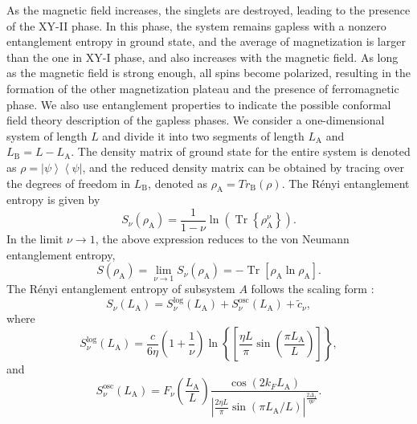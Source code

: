 \documentclass[aps,prx,showpacs,floatfix,twocolumn,superscriptaddress,nofootinbib,longbibliography]{revtex4-2}
\begin{document}
As the magnetic field increases, the singlets are destroyed, leading to the presence of the XY-II phase.  In this phase, the system remains gapless with a nonzero entanglement entropy in ground state, and the average of magnetization is larger than the one in XY-I phase, and also increases with the magnetic field.
  As long as the magnetic field is strong enough, all spins become polarized, resulting in the formation of the other magnetization plateau and the presence of ferromagnetic phase. We also use entanglement properties to indicate the possible conformal field theory description of the gapless phases. 
  We consider a one-dimensional system of length $L$ and
divide it into two segments of length $L_\mathrm{A}$ and $L_\mathrm{B} =L - L_\mathrm{A}$. The density matrix of ground state for the entire system is denoted as  $\rho=\left|\psi\right\rangle \left\langle \psi \right|$, and the reduced density matrix can be obtained by tracing
over the degrees of freedom in $L_\mathrm{B}$, denoted as $\rho_\mathrm{A} = Tr_\mathrm{B} (\rho)$. The R\'enyi entanglement  entropy is  given by
\begin{equation}
S_\nu \left(\rho_\mathrm{A}\right)=\frac{1}{1-\nu} \ln \left(\operatorname{Tr}\left\{\rho_\mathrm{A}^\nu\right\}\right).
\end{equation}
 In the limit $ \nu \rightarrow 1$, the above expression 
reduces to the von Neumann entanglement entropy,
\begin{equation}
S(\rho_\mathrm{A})=\lim _{\nu \rightarrow 1} S_\nu \left(\rho_\mathrm{A}\right)=-\operatorname{Tr}\left[\rho_\mathrm{A} \ln \rho_\mathrm{A}\right].
\end{equation}
The R\'enyi entanglement  entropy of subsystem  $A$ follows the scaling form \cite{PhysRevLett.104.095701,PhysRevB.92.054411,PhysRevB.105.014435}:
\begin{equation}
S_\nu\left(L_\mathrm{A}\right)=S_\nu^{\log }\left(L_\mathrm{A}\right)+S_\nu^{\operatorname{osc}}\left(L_\mathrm{A}\right)+\tilde{c}_\nu,
\end{equation}
where  
\begin{equation}
S_\nu^{\log }\left(L_\mathrm{A}\right)=\frac{c}{6 \eta}\left(1+\frac{1}{\nu}\right) \ln \left\{\left[\frac{\eta L}{\pi} \sin \left(\frac{\pi L_\mathrm{A}}{L}\right)\right]\right\},
\end{equation}
and 
\begin{equation}
S_\nu^{\mathrm{osc}}\left(L_\mathrm{A}\right)=F_\nu\left(\frac{L_\mathrm{A}}{L}\right)\frac{\cos \left(2 k_F L_\mathrm{A}\right)}{\left|\frac{2 \eta L}{\pi} \sin \left(\pi L_\mathrm{A} / L\right)\right|^{\frac{2 \Delta_1}{\eta \nu}}}.
\end{equation}
\end{document}
